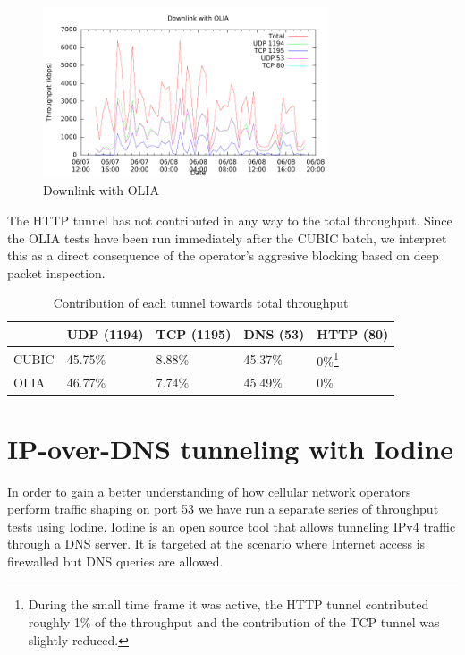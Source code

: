 \begin{figure}[H]
  \centering
  \includegraphics[width=0.75\textwidth]{img/down-olia}
  \caption{Downlink with OLIA}
  \label{fig:down-olia}
\end{figure}

The HTTP tunnel has not contributed in any way to the total throughput. Since
the OLIA tests have been run immediately after the CUBIC batch, we interpret
this as a direct consequence of the operator's aggresive blocking based on
deep packet inspection.
\begin{savenotes}
\begin{center}
	\begin{table}[htb]
	\centering
	\begin{tabular}{ | l | l | l | l | l | }
	\hline
	& UDP (1194) & TCP (1195) & DNS (53) & HTTP (80) \\ \hline
	CUBIC & 45.75\% & 8.88\% &  45.37\% & 0\%\footnote{During the small time frame it was active, the HTTP tunnel contributed roughly 1\% of the throughput and the contribution of the TCP tunnel was slightly reduced.} \\ \hline
	OLIA & 46.77\% & 7.74\% & 45.49\% & 0\% \\ \hline
	\end{tabular}
	\caption{Contribution of each tunnel towards total throughput}
	\label{table:iodine}
	\end{table}
\end{center}
\end{savenotes}

\section{IP-over-DNS tunneling with Iodine}

In order to gain a better understanding of how cellular network operators
perform traffic shaping on port 53 we have run a separate series of throughput
tests using Iodine. Iodine is an open source tool that allows tunneling IPv4
traffic through a DNS server. It is targeted at the scenario where Internet access is firewalled but DNS queries are allowed.

